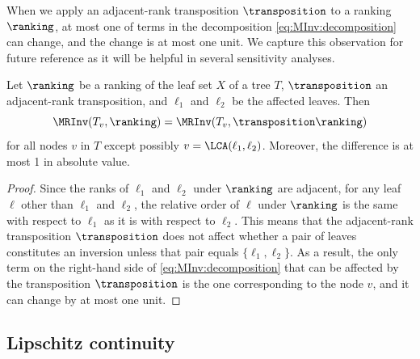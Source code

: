 When we apply an adjacent-rank transposition $\transposition$ to a ranking $\ranking$, at most one of terms in the decomposition \eqref{eq:MInv:decomposition} can change, and the change is at most one unit. We capture this observation for future reference
as it will be helpful in several sensitivity analyses.
\begin{proposition}\label{prop:change}
Let $\ranking$ be a ranking of the leaf set $X$ of a tree $T$, $\transposition$ an adjacent-rank transposition, and $\ell_1$ and $\ell_2$ be the affected leaves. Then
\[ \MRInv(T_v,\ranking) = \MRInv(T_v,\transposition \ranking) \]
for all nodes $v$ in $T$ except possibly $v = \LCA(\ell_1,\ell_2)$. Moreover, the difference is at most 1 in absolute value.
\end{proposition}
\begin{proof}
Since the ranks of $\ell_1$ and $\ell_2$ under $\ranking$ are adjacent, for any leaf $\ell$ other than $\ell_1$ and $\ell_2$, the relative order of $\ell$ under $\ranking$ is the same with respect to $\ell_1$ as it is with respect to $\ell_2$. This means that the adjacent-rank transposition $\transposition$ does not affect whether a pair of leaves constitutes an inversion unless that pair equals $\{\ell_1,\ell_2\}$. As a result, the only term on the right-hand side of \eqref{eq:MInv:decomposition} that can be affected by the transposition $\transposition$ is the one corresponding to the node $v$, and it can change by at most one unit.
\end{proof}

\subsection{Lipschitz continuity}
\label{sec:lipschitz}

